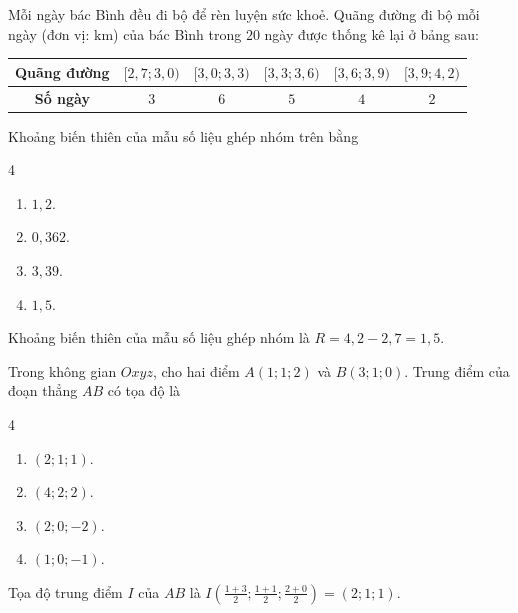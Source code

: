 \begin{baitap}
	Mỗi ngày bác Bình đều đi bộ để rèn luyện sức khoẻ. Quãng đường đi bộ mỗi ngày (đơn vị: $\mathrm{km}$) của bác Bình trong $20$ ngày được thống kê lại ở bảng sau:
	\begin{center}
		\begin{tabular}{|c|c|c|c|c|c|}
			\hline
			\textbf{Quãng đường} & $[2{,}7; 3{,}0)$ & $[3{,}0; 3{,}3)$ & $[3{,}3; 3{,}6)$ & $[3{,}6; 3{,}9)$ & $[3{,}9; 4{,}2)$ \\
			\hline
			\textbf{Số ngày} & $3$ & $6$ & $5$ & $4$ & $2$ \\
			\hline
		\end{tabular}
	\end{center}
	Khoảng biến thiên của mẫu số liệu ghép nhóm trên bằng
	\begin{multicols}{4}
		\begin{enumerate}
			\item $1{,}2$.
			\item $0{,}362$.
			\item $3{,}39$.
			\item $1{,}5$.
		\end{enumerate}
	\end{multicols}
	\begin{traloi}
		Khoảng biến thiên của mẫu số liệu ghép nhóm là $R = 4{,}2 - 2{,}7 = 1{,}5$.
	\end{traloi}
	\end{baitap}		
\begin{baitap}
	Trong không gian $Oxyz$, cho hai điểm $A(1; 1; 2)$ và $B(3; 1; 0)$. Trung điểm của đoạn thẳng $AB$ có tọa độ là
	\begin{multicols}{4}
		\begin{enumerate}
			\item $(2; 1; 1)$.
			\item $(4; 2; 2)$.
			\item $(2; 0; -2)$.
			\item $(1; 0; -1)$.
		\end{enumerate}
	\end{multicols}
	\begin{traloi}
		\dapan{A}
		Tọa độ trung điểm $I$ của $AB$ là $I\left(\frac{1+3}{2}; \frac{1+1}{2}; \frac{2+0}{2}\right) = (2; 1; 1)$.
	\end{traloi}
\end{baitap}

